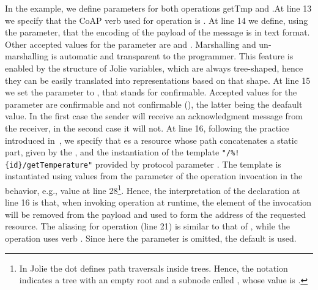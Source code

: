 In the example, we define  parameters for both operations \code
{getTmp} and .\@ At line 13 we specify that the CoAP verb used for
operation  is . At line 14 we define, using the
 parameter, that the encoding of the payload of the message
is in text format. Other accepted values for the  parameter
are  and . Marshalling and un-marshalling is automatic
and transparent to the programmer. This feature is enabled by the structure of
Jolie variables, which are always tree-shaped, hence they can be easily
translated into representations based on that shape. At line 15 we set the
 parameter to , that stands for confirmable.
Accepted values for the  parameter are confirmable and not
confirmable (), the latter being the deafault value. In the first
case the sender will receive an acknowledgment message from the receiver, in the
second case it will not. At line 16, following the practice introduced
in~\cite{montesi16}, we specify that  es a resource
whose path concatenates a static part, given by the , and the
instantiation of the template \lstinline|"/%!{id}/getTemperature"| provided by
protocol parameter . The template is instantiated using values from
the parameter of the operation invocation in the behavior, e.g., value 
at line 28\footnote{In Jolie the dot  defines path traversals inside
trees. Hence, the notation  indicates a tree with an empty
root and a subnode called , whose value is .}. Hence, the
interpretation of the declaration at line 16 is that, when invoking operation
 at runtime, the element  of the invocation will be
removed from the payload and used to form the address of the requested resource.
The aliasing for operation  (line 21) is similar to that of
, while the operation uses verb . Since here the
 parameter is omitted, the default  is
used.

